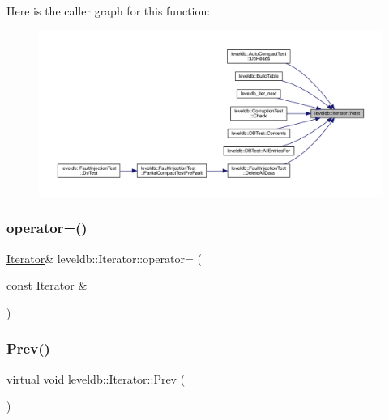Here is the caller graph for this function\+:
\nopagebreak
\begin{figure}[H]
\begin{center}
\leavevmode
\includegraphics[width=350pt]{classleveldb_1_1_iterator_aea54a5ca7eb942eb15770820529410e7_icgraph}
\end{center}
\end{figure}
\mbox{\label{classleveldb_1_1_iterator_aa893453777013b3a7b9367b605076111}} 
\subsubsection{\texorpdfstring{operator=()}{operator=()}}
{\footnotesize\ttfamily \mbox{\hyperlink{classleveldb_1_1_iterator}{Iterator}}\& leveldb\+::\+Iterator\+::operator= (\begin{DoxyParamCaption}\item[{const \mbox{\hyperlink{classleveldb_1_1_iterator}{Iterator}} \&}]{ }\end{DoxyParamCaption})\hspace{0.3cm}{\ttfamily [delete]}}

\mbox{\label{classleveldb_1_1_iterator_a28798d802a203788587dc6adc5bc729e}} 
\subsubsection{\texorpdfstring{Prev()}{Prev()}}
{\footnotesize\ttfamily virtual void leveldb\+::\+Iterator\+::\+Prev (\begin{DoxyParamCaption}{ }\end{DoxyParamCaption})\hspace{0.3cm}{\ttfamily [pure virtual]}}




